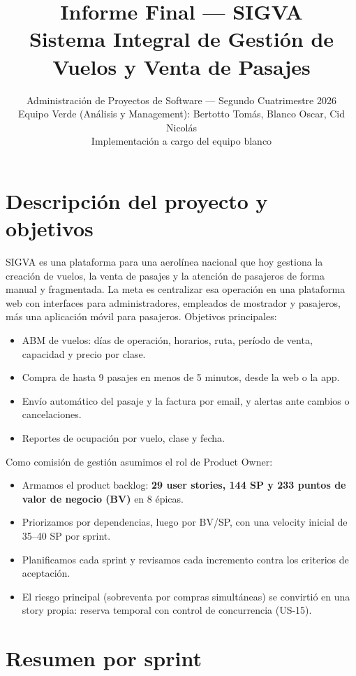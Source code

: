 \documentclass[11pt,a4paper]{article}
\title{\vspace{-1.8cm}\textbf{Informe Final --- SIGVA}\\[3pt]
\large Sistema Integral de Gestión de Vuelos y Venta de Pasajes}
\author{\normalsize Administración de Proyectos de Software --- Segundo Cuatrimestre 2026\\[2pt]
\normalsize Equipo Verde (Análisis y Management): Bertotto Tomás, Blanco Oscar, Cid Nicolás\\[2pt]
\small Implementación a cargo del equipo blanco}
\date{}
\begin{document}
\maketitle
\vspace{-0.5cm}

\section{Descripción del proyecto y objetivos}

SIGVA es una plataforma para una aerolínea nacional que hoy gestiona la creación de vuelos, la venta de pasajes y la atención de pasajeros de forma manual y fragmentada. La meta es centralizar esa operación en una plataforma web con interfaces para administradores, empleados de mostrador y pasajeros, más una aplicación móvil para pasajeros. Objetivos principales:
\begin{itemize}
  \item ABM de vuelos: días de operación, horarios, ruta, período de venta, capacidad y precio por clase.
  \item Compra de hasta 9 pasajes en menos de 5 minutos, desde la web o la app.
  \item Envío automático del pasaje y la factura por email, y alertas ante cambios o cancelaciones.
  \item Reportes de ocupación por vuelo, clase y fecha.
\end{itemize}

Como comisión de gestión asumimos el rol de Product Owner:
\begin{itemize}
  \item Armamos el product backlog: \textbf{29 user stories, 144 SP y 233 puntos de valor de negocio (BV)} en 8 épicas.
  \item Priorizamos por dependencias, luego por BV/SP, con una velocity inicial de 35--40 SP por sprint.
  \item Planificamos cada sprint y revisamos cada incremento contra los criterios de aceptación.
  \item El riesgo principal (sobreventa por compras simultáneas) se convirtió en una story propia: reserva temporal con control de concurrencia (US-15).
\end{itemize}

\section{Resumen por sprint}
\end{document}
